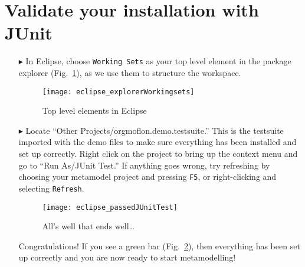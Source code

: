 \newpage
\genHeader
\hypertarget{validate common}{} 
\section{Validate your installation with JUnit}

\begin{itemize}

\item[$\blacktriangleright$] In Eclipse, choose \texttt{Working Sets} as your top level element in the package explorer (Fig.~\ref{eclipse:topLevel}), as we use
them to structure the workspace.

\begin{figure}[htbp]
	\centering
  \texttt{[image: eclipse\_explorerWorkingsets]}
	\caption{Top level elements in Eclipse}
	\label{eclipse:topLevel}
\end{figure}

\item[$\blacktriangleright$] Locate ``Other Projects/orgmoflon.demo.testsuite.'' This is the testsuite imported with the demo files to make sure everything has been installed and
set up correctly. Right click on the project to bring up the context menu and go to ``Run As/JUnit Test.'' If anything goes wrong, try refreshing by choosing
your metamodel project and pressing  \texttt{F5}, or right-clicking and selecting \texttt{Refresh}.

\vspace{0.5cm}

\begin{figure}[htbp]
	\centering
  \texttt{[image: eclipse\_passedJUnitTest]}
	\caption{All's well that ends well\ldots}
	\label{eclipse:passedTest}
\end{figure}

\vspace{0.5cm}

Congratulations!  If you see a green bar  (Fig.~\ref{eclipse:passedTest}), then everything has been set up correctly and you are now ready to start
metamodelling!


\end{itemize}